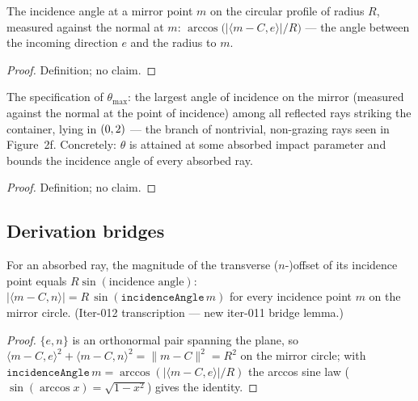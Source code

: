 \begin{definition}
\label{def:IPhO2026Problems_problem_IPhO_2026_2_B_2:incidenceAngle}
The incidence angle at a mirror point $m$ on the circular profile of
radius $R$, measured against the normal at $m$:
$\arccos\bigl(|\langle m - C, e\rangle| / R\bigr)$ --- the angle
between the incoming direction $e$ and the radius to $m$.
\end{definition}
\begin{proof}
Definition; no claim.
\end{proof}

\begin{definition}
\label{def:IPhO2026Problems_problem_IPhO_2026_2_B_2:ThetaMaxSpec}
The specification of $\theta_{\max}$: the largest angle of incidence on
the mirror (measured against the normal at the point of incidence) among
all reflected rays striking the container, lying in $(0, \/2)$ --- the
branch of nontrivial, non-grazing rays seen in Figure~2f.  Concretely:
$\theta$ is attained at some absorbed impact parameter and bounds the
incidence angle of every absorbed ray.
\end{definition}
\begin{proof}
Definition; no claim.
\end{proof}

\subsection*{Derivation bridges}

\begin{lemma}
\label{lem:IPhO2026Problems_problem_IPhO_2026_2_B_2:abs_hitOffset_eq}
For an absorbed ray, the magnitude of the transverse ($n$-)offset of its
incidence point equals $R \sin(\text{incidence angle})$:
$|\langle m - C, n\rangle| = R\,\sin(\texttt{incidenceAngle}\,m)$ for
every incidence point $m$ on the mirror circle.  (Iter-012 transcription
--- new iter-011 bridge lemma.)
\end{lemma}
\begin{proof}
$\{e, n\}$ is an orthonormal pair spanning the plane, so
$\langle m-C, e\rangle^2 + \langle m-C, n\rangle^2 = \|m-C\|^2 = R^2$ on
the mirror circle; with $\texttt{incidenceAngle}\,m =
\arccos(|\langle m-C, e\rangle|/R)$ the arccos sine law
($\sin(\arccos x) = \sqrt{1-x^2}$) gives the identity.
\end{proof}

